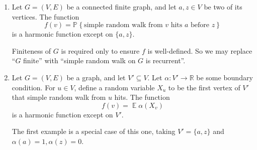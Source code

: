 \documentclass[12pt]{article}
\newcommand{\Prob}[2]{\mathbb{P}_{#1}\left\{#2\right\}}
\newcommand{\Expect}{\mathbb{E}}
\newcommand{\Reals}{\mathbb{R}}
\begin{document}
\begin{enumerate}

\item
Let $G=(V,E)$ be a connected finite graph, and let $a,z\in V$ be two of its vertices.  The function
$$
f(v) = \Prob{}{\text{simple random walk from $v$ hits $a$ before $z$}}
$$
is a harmonic function except on $\{a,z\}$.

Finiteness of $G$ is required only to ensure $f$ is well-defined.  So we may replace ``$G$ finite'' with ``simple random walk on $G$ is recurrent''.

\item
Let $G=(V,E)$ be a graph, and let $V'\subseteq V$.  Let $\alpha: V'\to \Reals$ be some boundary condition.  For $u\in V$, define a random variable $X_u$ to be the first vertex of $V'$ that simple random walk from $u$ hits.  The function
$$
f(v) = \operatorname{\Expect} \alpha(X_v)
$$
is a harmonic function except on $V'$.

The first example is a special case of this one, taking $V'=\{a,z\}$ and $\alpha(a)=1, \alpha(z)=0$.

\end{enumerate}
\end{document}
